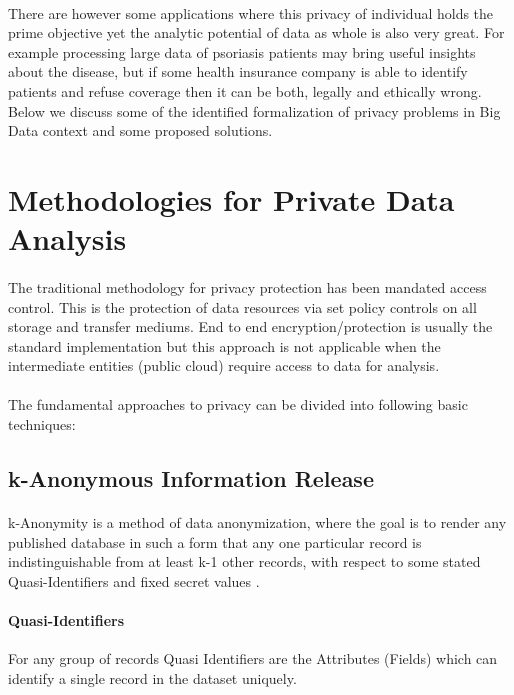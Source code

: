 \documentclass{report}
\begin{document}
\paragraph{}
There are however some applications where this privacy of individual holds the prime objective yet the analytic potential of data as whole is also very great. For example processing large data of psoriasis patients may bring useful insights about the disease, but if some health insurance company is able to identify patients and refuse coverage then it can be both, legally and ethically wrong. 
Below we discuss some of the identified formalization of privacy problems in Big Data context and some proposed solutions.

\section{Methodologies for Private Data Analysis}
\paragraph{}
The traditional methodology for privacy protection has been mandated access control. This is the protection of data resources via set policy controls on all storage and transfer mediums. End to end encryption/protection is usually the standard implementation but this approach is not applicable when the intermediate entities (public cloud) require access to data for analysis.
\paragraph{}
The fundamental approaches to privacy can be divided into following basic techniques:


\subsection{k-Anonymous Information Release}
\paragraph{}
k-Anonymity \cite{sweeney2002k} is a method of data anonymization, where the goal is to render any published database in such a form that any one particular record is indistinguishable from at least k-1 other records, with respect to some stated Quasi-Identifiers and fixed secret values \cite{dalenius1986finding}.

\paragraph{Quasi-Identifiers}
For any group of records Quasi Identifiers are the Attributes (Fields) which can identify a single record in the dataset uniquely.
\end{document}
